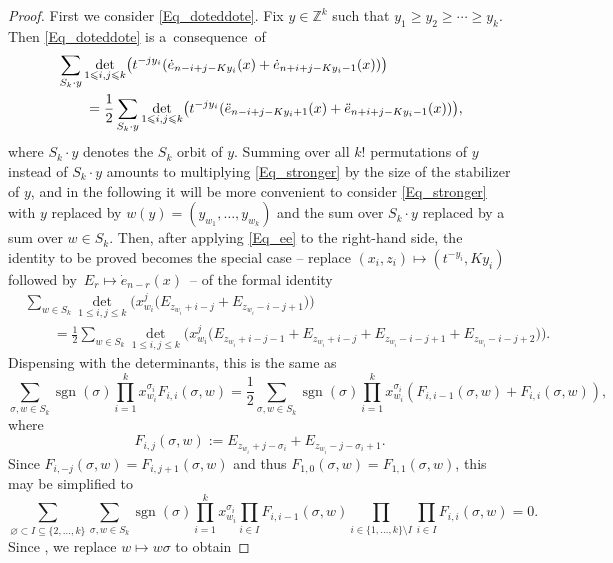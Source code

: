 \documentclass[10pt,a4paper]{amsart}
\DeclareMathOperator{\sgn}{sgn}
\renewcommand{\geq}{\geqslant}
\renewcommand{\leq}{\leqslant}
\begin{document}
\begin{proof}
First we consider \eqref{Eq_doteddote}.
Fix $y\in\mathbb{Z}^k$ such that $y_1\geq y_2\geq\cdots\geq y_k$.
Then \eqref{Eq_doteddote} is a~consequence~of
\begin{align}
&\sum_{S_k\cdot y} \det_{1\leq i,j\leq k}\bigl( t^{-jy_i}
 (\dot{e}_{n-i+j-Ky_i}(x)+\dot{e}_{n+i+j-Ky_i-1}(x) )\bigr) \notag \\
&\qquad=\frac{1}{2}\sum_{S_k\cdot y} \det_{1\leq i,j\leq k}\bigl(
t^{-jy_i}
 (\ddot{e}_{n-i+j-Ky_i+1}(x)+\ddot{e}_{n+i+j-Ky_i-1}(x) )\bigr),
\label{Eq_stronger}
\end{align}
where $S_k\cdot y$ denotes the $S_k$ orbit of $y$.
Summing over all $k!$ permutations of $y$ instead of $S_k\cdot y$
amounts to multiplying \eqref{Eq_stronger} by the size of
the stabilizer of $y$, and in the following it will
be more convenient to consider \eqref{Eq_stronger} with $y$ replaced by
$w(y)=(y_{w_1},\dots,y_{w_k})$ and the sum over $S_k\cdot y$ replaced
by a sum over $w\in S_k$.
Then, after applying \eqref{Eq_ee} to the right-hand side, the identity
to be proved becomes the special case --
replace $(x_i,z_i)\mapsto (t^{-y_i},Ky_i)$ followed
by~${E_r\mapsto \dot{e}_{n-r}(x)}$~-- of the formal identity
\begin{align*}
&\sum_{w\in S_k} \det_{1\leq i,j\leq k}\bigl(x_{w_i}^j
\bigl(E_{z_{w_i}+i-j}+E_{z_{w_i}-i-j+1}\bigr)\bigr) \\
&\qquad{}=\frac{1}{2}\sum_{w\in S_k}
\det_{1\leq i,j\leq k}\bigl(
x_{w_i}^j \bigl(E_{z_{w_i}+i-j-1}+E_{z_{w_i}+i-j}+
E_{z_{w_i}-i-j+1}+E_{z_{w_i}-i-j+2}\bigr)\bigr).
\end{align*}
Dispensing with the determinants, this is the same as
\[
\sum_{\sigma,w\in S_k}\sgn(\sigma)\prod_{i=1}^k
x_{w_i}^{\sigma_i} F_{i,i}(\sigma,w)
=\frac{1}{2}\sum_{\sigma,w\in S_k}\sgn(\sigma)\prod_{i=1}^k
x_{w_i}^{\sigma_i} (F_{i,i-1}(\sigma,w)+F_{i,i}(\sigma,w) ),
\]
where
\[
F_{i,j}(\sigma,w):=E_{z_{w_i}+j-\sigma_i}+E_{z_{w_i}-j-\sigma_i+1}.
\]
Since $F_{i,-j}(\sigma,w)=F_{i,j+1}(\sigma,w)$ and thus
$F_{1,0}(\sigma,w)=F_{1,1}(\sigma,w)$, this may be simplified to
\begin{equation}\label{Eq_setsum}
\sum_{\varnothing\subset I\subseteq\{2,\dots,k\}}
\sum_{\sigma,w\in S_k}\sgn(\sigma)
\prod_{i=1}^k x_{w_i}^{\sigma_i}
\prod_{i\in I} F_{i,i-1}(\sigma,w)
\prod_{i\in\{1,\dots,k\}\setminus I}
\prod_{i\in I} F_{i,i}(\sigma,w)=0.
\end{equation}
Since ,
we replace $w\mapsto w\sigma$ to obtain

\end{proof}
\end{document}
